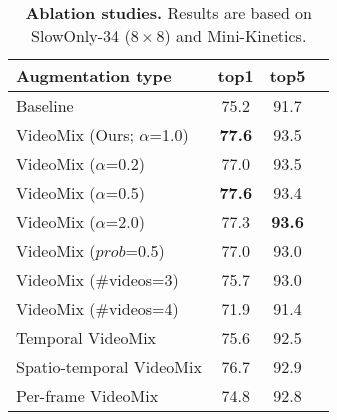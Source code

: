 \begin{table}[t]
\centering
\begin{tabular}{@{}lccc@{}}
\toprule
Augmentation type         & top1 & top5 \\ \midrule
Baseline    &  75.2   & 91.7 \\
VideoMix (Ours; $\alpha$=1.0) &  \textbf{77.6}   & {93.5} \\ \midrule
VideoMix ($\alpha$=0.2)     &  77.0   & {93.5} \\
VideoMix ($\alpha$=0.5)     &  \textbf{77.6}   & 93.4 \\
VideoMix ($\alpha$=2.0)     &  77.3   & \textbf{93.6} \\
VideoMix ($prob$=0.5)          &  77.0   & 93.0 \\\midrule
VideoMix (\#videos=3)     &  75.7   & 93.0 \\
VideoMix (\#videos=4)     &  71.9   & 91.4 \\ \midrule
Temporal VideoMix           &  75.6   & 92.5 \\
Spatio-temporal VideoMix    &  76.7  & 92.9 \\
Per-frame VideoMix          &  74.8   & 92.8  \\  
\midrule
\end{tabular}
\caption{\textbf{Ablation studies.} Results are based on SlowOnly-34 ($8\times8$) and Mini-Kinetics.}
\label{table:experiment:albation}
\end{table}
